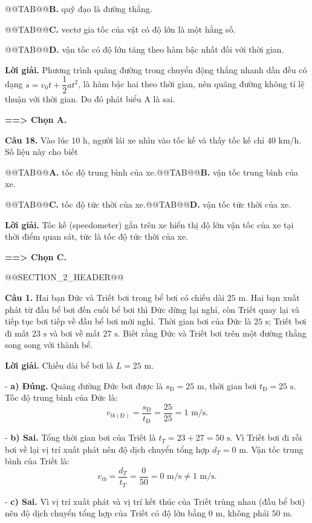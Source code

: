 \documentclass[11pt,a4paper]{article}
\begin{document}
@@TAB@@\textbf{B.} quỹ đạo là đường thẳng.

@@TAB@@\textbf{C.} vectơ gia tốc của vật có độ lớn là một hằng số.

@@TAB@@\textbf{D.} vận tốc có độ lớn tăng theo hàm bậc nhất đối với thời gian.

\textbf{Lời giải.} Phương trình quãng đường trong chuyển động thẳng nhanh dần đều có dạng $s = v_0 t + \dfrac{1}{2}at^2$, là hàm bậc hai theo thời gian, nên quãng đường không tỉ lệ thuận với thời gian. Do đó phát biểu A là sai.

\textbf{==> Chọn A.}

\textbf{Câu 18.} Vào lúc $10\text{ h}$, người lái xe nhìn vào tốc kế và thấy tốc kế chỉ $40\text{ km/h}$. Số liệu này cho biết

@@TAB@@\textbf{A.} tốc độ trung bình của xe.@@TAB@@\textbf{B.} vận tốc trung bình của xe.

@@TAB@@\textbf{C.} tốc độ tức thời của xe.@@TAB@@\textbf{D.} vận tốc tức thời của xe.

\textbf{Lời giải.} Tốc kế (speedometer) gắn trên xe hiển thị độ lớn vận tốc của xe tại thời điểm quan sát, tức là tốc độ tức thời của xe.

\textbf{==> Chọn C.}

@@SECTION_2_HEADER@@

\textbf{Câu 1.} Hai bạn Đức và Triết bơi trong bể bơi có chiều dài $25\text{ m}$. Hai bạn xuất phát từ đầu bể bơi đến cuối bể bơi thì Đức dừng lại nghỉ, còn Triết quay lại và tiếp tục bơi tiếp về đầu bể bơi mới nghỉ. Thời gian bơi của Đức là $25\text{ s}$; Triết bơi đi mất $23\text{ s}$ và bơi về mất $27\text{ s}$. Biết rằng Đức và Triết bơi trên một đường thẳng song song với thành bể.

\textbf{Lời giải.} Chiều dài bể bơi là $L = 25\text{ m}$.

- \textbf{a) Đúng.} Quãng đường Đức bơi được là $s_{\text{Đ}} = 25\text{ m}$, thời gian bơi $t_{\text{Đ}} = 25\text{ s}$. Tốc độ trung bình của Đức là:
\[
v_{tb(\text{Đ})} = \frac{s_{\text{Đ}}}{t_{\text{Đ}}} = \frac{25}{25} = 1\text{ m/s}.
\]

- \textbf{b) Sai.} Tổng thời gian bơi của Triết là $t_T = 23 + 27 = 50\text{ s}$. Vì Triết bơi đi rồi bơi về lại vị trí xuất phát nên độ dịch chuyển tổng hợp $d_T = 0\text{ m}$. Vận tốc trung bình của Triết là:
\[
v_{tb} = \frac{d_T}{t_T} = \frac{0}{50} = 0\text{ m/s} \ne 1\text{ m/s}.
\]

- \textbf{c) Sai.} Vì vị trí xuất phát và vị trí kết thúc của Triết trùng nhau (đầu bể bơi) nên độ dịch chuyển tổng hợp của Triết có độ lớn bằng $0\text{ m}$, không phải $50\text{ m}$.
\end{document}

